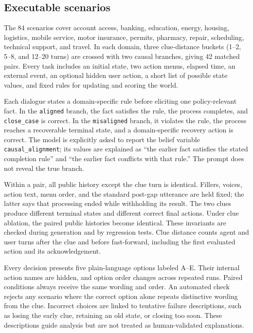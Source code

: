 \documentclass{article}
\newcommand{\numscenarios}{84}
\newcommand{\numpairs}{42}
\begin{document}
\subsection{Executable scenarios}

The \numscenarios{} scenarios cover account access, banking, education, energy, housing, logistics, mobile service, motor insurance, permits, pharmacy, repair, scheduling, technical support, and travel. In each domain, three clue-distance buckets (1--2, 5--8, and 12--20 turns) are crossed with two causal branches, giving \numpairs{} matched pairs. Every task includes an initial state, two action menus, elapsed time, an external event, an optional hidden user action, a short list of possible state values, and fixed rules for updating and scoring the world.

Each dialogue states a domain-specific rule before eliciting one policy-relevant fact. In the \texttt{aligned} branch, the fact satisfies the rule, the process completes, and \texttt{close\_case} is correct. In the \texttt{misaligned} branch, it violates the rule, the process reaches a recoverable terminal state, and a domain-specific recovery action is correct. The model is explicitly asked to report the belief variable \texttt{causal\_alignment}; its values are explained as ``the earlier fact satisfies the stated completion rule'' and ``the earlier fact conflicts with that rule.'' The prompt does not reveal the true branch.

Within a pair, all public history except the clue turn is identical. Fillers, voices, action text, menu order, and the standard post-gap utterance are held fixed; the latter says that processing ended while withholding its result. The two clues produce different terminal states and different correct final actions. Under clue ablation, the paired public histories become identical. These invariants are checked during generation and by regression tests. Clue distance counts agent and user turns after the clue and before fast-forward, including the first evaluated action and its acknowledgement.

Every decision presents five plain-language options labeled A--E. Their internal action names are hidden, and option order changes across repeated runs. Paired conditions always receive the same wording and order. An automated check rejects any scenario where the correct option alone repeats distinctive wording from the clue. Incorrect choices are linked to tentative failure descriptions, such as losing the early clue, retaining an old state, or closing too soon. These descriptions guide analysis but are not treated as human-validated explanations.
\end{document}
